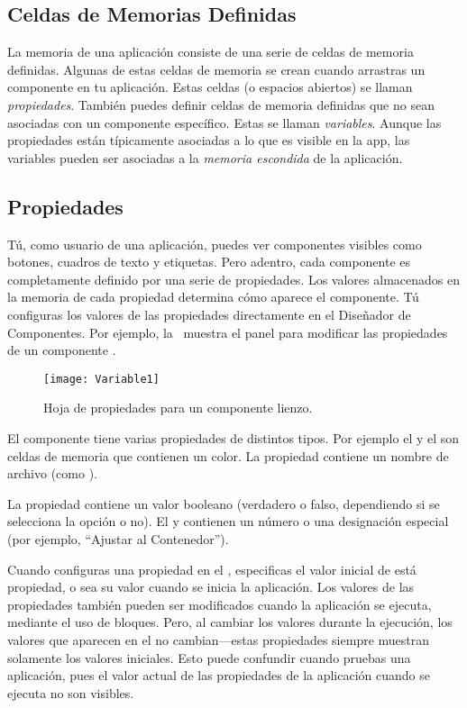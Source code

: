 \subsection*{Celdas de Memorias Definidas}

La memoria de una aplicación consiste de una serie de celdas de
memoria definidas. Algunas de estas celdas de memoria se crean cuando
arrastras un componente en tu aplicación. Estas celdas (o espacios
abiertos) se llaman \emph{propiedades}. También puedes definir celdas
de memoria definidas que no sean asociadas con un componente
específico. Estas se llaman \emph{variables}. Aunque las propiedades
están típicamente asociadas a lo que es visible en la app, las
variables pueden ser asociadas a la \emph{memoria escondida} de la
aplicación.

\subsection*{Propiedades}

Tú, como usuario de una aplicación, puedes ver componentes visibles
como botones, cuadros de texto y etiquetas. Pero adentro, cada
componente es completamente definido por una serie de propiedades. Los
valores almacenados en la memoria de cada propiedad determina cómo
aparece el componente. Tú configuras los valores de las propiedades
directamente en el Diseñador de Componentes. Por ejemplo,
la~ muestra el panel para modificar las
propiedades de un componente .

\begin{figure}[H]
\centering
\texttt{[image: Variable1]}
\caption{Hoja de propiedades para un componente lienzo.}
\label{fig:Variable1}
\end{figure}

El componente  tiene varias propiedades de distintos
tipos. Por ejemplo el  y el
 son celdas de memoria que contienen un
color. La propiedad  contiene un nombre de
archivo (como ).

La propiedad  contiene un valor booleano (verdadero
o falso, dependiendo si se selecciona la opción o no). El
 y  contienen un número o una
designación especial (por ejemplo, ``Ajustar al Contenedor'').

Cuando configuras una propiedad en el \componentDesigner, especificas
el valor inicial de está propiedad, o sea su valor cuando se inicia la
aplicación. Los valores de las propiedades también pueden ser
modificados cuando la aplicación se ejecuta, mediante el uso de
bloques. Pero, al cambiar los valores durante la ejecución, los
valores que aparecen en el \componentDesigner no cambian---estas
propiedades siempre muestran solamente los valores iniciales. Esto
puede confundir cuando pruebas una aplicación, pues el valor actual de
las propiedades de la aplicación cuando se ejecuta no son visibles.

